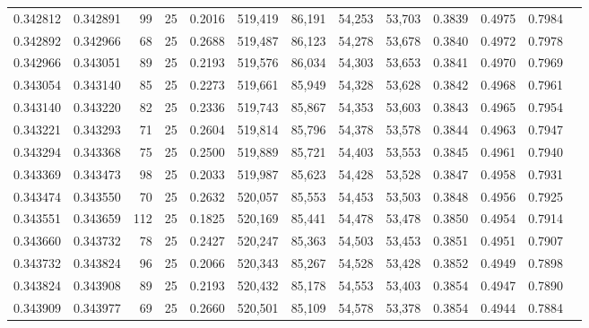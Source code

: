 \begin{tabular}{rrrrrrrrrrrrr}
0.342812 & 0.342891 &    99 &  25 &                                     0.2016 & 519,419 &  86,191 &  54,253 &  53,703 & 0.3839 & 0.4975 & 0.7984 \\
0.342892 & 0.342966 &    68 &  25 &                                     0.2688 & 519,487 &  86,123 &  54,278 &  53,678 & 0.3840 & 0.4972 & 0.7978 \\
0.342966 & 0.343051 &    89 &  25 &                                     0.2193 & 519,576 &  86,034 &  54,303 &  53,653 & 0.3841 & 0.4970 & 0.7969 \\
0.343054 & 0.343140 &    85 &  25 &                                     0.2273 & 519,661 &  85,949 &  54,328 &  53,628 & 0.3842 & 0.4968 & 0.7961 \\
0.343140 & 0.343220 &    82 &  25 &                                     0.2336 & 519,743 &  85,867 &  54,353 &  53,603 & 0.3843 & 0.4965 & 0.7954 \\
0.343221 & 0.343293 &    71 &  25 &                                     0.2604 & 519,814 &  85,796 &  54,378 &  53,578 & 0.3844 & 0.4963 & 0.7947 \\
0.343294 & 0.343368 &    75 &  25 &                                     0.2500 & 519,889 &  85,721 &  54,403 &  53,553 & 0.3845 & 0.4961 & 0.7940 \\
0.343369 & 0.343473 &    98 &  25 &                                     0.2033 & 519,987 &  85,623 &  54,428 &  53,528 & 0.3847 & 0.4958 & 0.7931 \\
0.343474 & 0.343550 &    70 &  25 &                                     0.2632 & 520,057 &  85,553 &  54,453 &  53,503 & 0.3848 & 0.4956 & 0.7925 \\
0.343551 & 0.343659 &   112 &  25 &                                     0.1825 & 520,169 &  85,441 &  54,478 &  53,478 & 0.3850 & 0.4954 & 0.7914 \\
0.343660 & 0.343732 &    78 &  25 &                                     0.2427 & 520,247 &  85,363 &  54,503 &  53,453 & 0.3851 & 0.4951 & 0.7907 \\
0.343732 & 0.343824 &    96 &  25 &                                     0.2066 & 520,343 &  85,267 &  54,528 &  53,428 & 0.3852 & 0.4949 & 0.7898 \\
0.343824 & 0.343908 &    89 &  25 &                                     0.2193 & 520,432 &  85,178 &  54,553 &  53,403 & 0.3854 & 0.4947 & 0.7890 \\
0.343909 & 0.343977 &    69 &  25 &                                     0.2660 & 520,501 &  85,109 &  54,578 &  53,378 & 0.3854 & 0.4944 & 0.7884 \\

\end{tabular}
